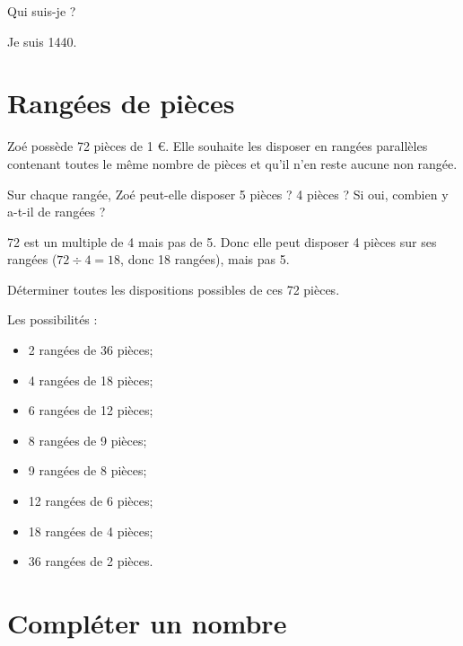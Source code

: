 \documentclass[a4paper,11pt]{exam}
\begin{document}
	
	\begin{questions}
		\question Qui suis-je ?
		\begin{solution}
			Je suis \num{1440}.
		\end{solution}
	\end{questions}
	
	
\section{Rangées de pièces}
	Zoé possède 72 pièces de 1 €. Elle souhaite les disposer en rangées parallèles contenant toutes le même nombre de pièces et qu'il n'en reste aucune non rangée.
	
	\begin{questions}
		\question Sur chaque rangée, Zoé peut-elle disposer 5 pièces ? 4 pièces ? Si oui, combien y a-t-il de rangées ?
		\begin{solution}
			72 est un multiple de 4 mais pas de 5. Donc elle peut disposer 4 pièces sur ses rangées ($72 \div 4 = 18$, donc 18 rangées), mais pas 5.
		\end{solution}
		
		\question Déterminer toutes les dispositions possibles de ces 72 pièces.
		\begin{solution}
			Les possibilités :
			\begin{multicols}{2}
				\begin{itemize}
					\item 2 rangées de 36 pièces;
					\item 4 rangées de 18 pièces;
					\item 6 rangées de 12 pièces;
					\item 8 rangées de 9 pièces;
					\item 9 rangées de 8 pièces;
					\item 12 rangées de 6 pièces;
					\item 18 rangées de 4 pièces;
					\item 36 rangées de 2 pièces.
				\end{itemize}
			\end{multicols}
			
		\end{solution}
	\end{questions}
	
	\section{Compléter un nombre}
	
\end{document}
